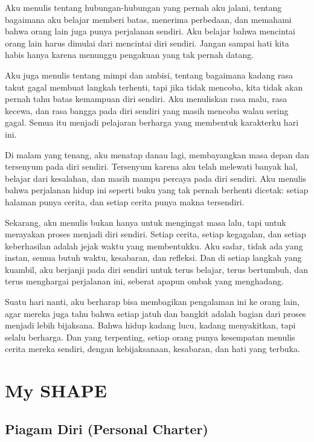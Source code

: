 \documentclass[
  letterpaper,
  DIV=11,
  numbers=noendperiod]{scrreprt}
\begin{document}
Aku menulis tentang hubungan-hubungan yang pernah aku jalani, tentang
bagaimana aku belajar memberi batas, menerima perbedaan, dan memahami
bahwa orang lain juga punya perjalanan sendiri. Aku belajar bahwa
mencintai orang lain harus dimulai dari mencintai diri sendiri. Jangan
sampai hati kita habis hanya karena menunggu pengakuan yang tak pernah
datang.

Aku juga menulis tentang mimpi dan ambisi, tentang bagaimana kadang rasa
takut gagal membuat langkah terhenti, tapi jika tidak mencoba, kita
tidak akan pernah tahu batas kemampuan diri sendiri. Aku menuliskan rasa
malu, rasa kecewa, dan rasa bangga pada diri sendiri yang masih mencoba
walau sering gagal. Semua itu menjadi pelajaran berharga yang membentuk
karakterku hari ini.

Di malam yang tenang, aku menatap danau lagi, membayangkan masa depan
dan tersenyum pada diri sendiri. Tersenyum karena aku telah melewati
banyak hal, belajar dari kesalahan, dan masih mampu percaya pada diri
sendiri. Aku menulis bahwa perjalanan hidup ini seperti buku yang tak
pernah berhenti dicetak: setiap halaman punya cerita, dan setiap cerita
punya makna tersendiri.

Sekarang, aku menulis bukan hanya untuk mengingat masa lalu, tapi untuk
merayakan proses menjadi diri sendiri. Setiap cerita, setiap kegagalan,
dan setiap keberhasilan adalah jejak waktu yang membentukku. Aku sadar,
tidak ada yang instan, semua butuh waktu, kesabaran, dan refleksi. Dan
di setiap langkah yang kuambil, aku berjanji pada diri sendiri untuk
terus belajar, terus bertumbuh, dan terus menghargai perjalanan ini,
seberat apapun ombak yang menghadang.

Suatu hari nanti, aku berharap bisa membagikan pengalaman ini ke orang
lain, agar mereka juga tahu bahwa setiap jatuh dan bangkit adalah bagian
dari proses menjadi lebih bijaksana. Bahwa hidup kadang lucu, kadang
menyakitkan, tapi selalu berharga. Dan yang terpenting, setiap orang
punya kesempatan menulis cerita mereka sendiri, dengan kebijaksanaan,
kesabaran, dan hati yang terbuka.


\chapter{My SHAPE}\label{my-shape}

\section{Piagam Diri (Personal
Charter)}\label{piagam-diri-personal-charter}
\end{document}
